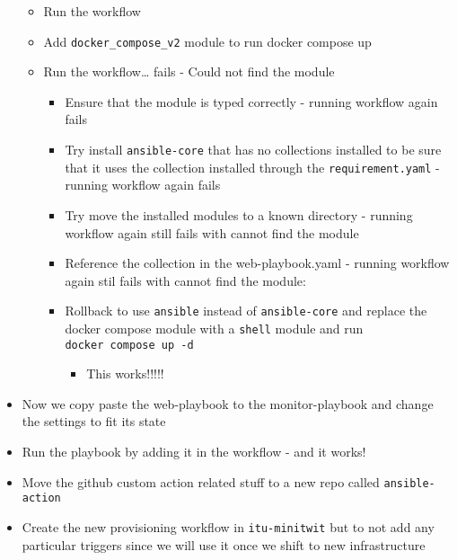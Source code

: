\begin{itemize}
\begin{itemize}
        \item Run the workflow
        \item Add \texttt{docker\_compose\_v2} module to run docker compose up
        \item Run the workflow\ldots{} fails - Could not find the module

        \begin{itemize}
            \item Ensure that the module is typed correctly - running workflow again fails
            \item Try install \texttt{ansible-core} that has no collections installed to be sure that it uses the collection installed through the \texttt{requirement.yaml} - running workflow again fails
            \item Try move the installed modules to a known directory - running workflow again still fails with cannot find the module
            \item Reference the collection in the web-playbook.yaml - running workflow again stil fails with cannot find the module:


            \item Rollback to use \texttt{ansible} instead of \texttt{ansible-core} and replace the docker compose module with a \texttt{shell} module and run \texttt{docker\ compose\ up\ -d}

            \begin{itemize}
                \item This works!!!!!
            \end{itemize}
        \end{itemize}
    \end{itemize}
    \item Now we copy paste the web-playbook to the monitor-playbook and change the settings to fit its state
    \item Run the playbook by adding it in the workflow - and it works!
    \item Move the github custom action related stuff to a new repo called \texttt{ansible-action}
    \item Create the new provisioning workflow in \texttt{itu-minitwit} but to not add any particular triggers since we will use it once we shift to new infrastructure


\end{itemize}
